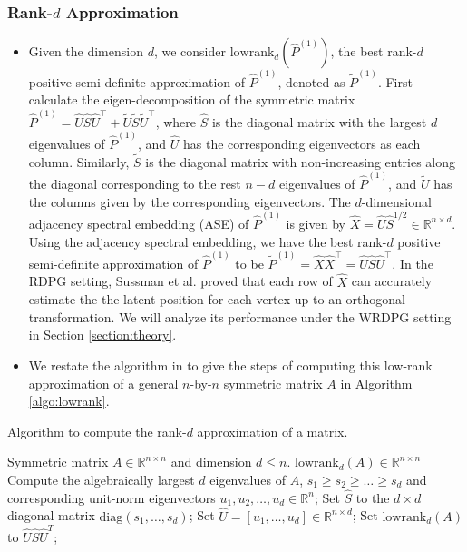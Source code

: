 \documentclass[a4paper]{article}
\renewcommand{\hat}{\widehat}
\renewcommand{\tilde}{\widetilde}
\begin{document}
\subsubsection{Rank-$d$ Approximation}
\begin{itemize}
\item Given the dimension $d$, we consider $\mathrm{lowrank}_d(\hat{P}^{(1)})$, the best rank-$d$ positive semi-definite approximation of $\hat{P}^{(1)}$, denoted as $\widetilde{P}^{(1)}$. First calculate the eigen-decomposition of the symmetric matrix $\hat{P}^{(1)} = \hat{U} \hat{S} \hat{U}^{\top} + \widetilde{U} \widetilde{S} \widetilde{U}^{\top}$, where $\hat{S}$ is the diagonal matrix with the largest $d$ eigenvalues of $\hat{P}^{(1)}$, and $\hat{U}$ has the corresponding eigenvectors as each column. Similarly, $\tilde{S}$ is the diagonal matrix with non-increasing entries along the diagonal corresponding to the rest $n - d$ eigenvalues of $\hat{P}^{(1)}$, and $\tilde{U}$ has the columns given by the corresponding eigenvectors.
The $d$-dimensional adjacency spectral embedding (ASE) of $\hat{P}^{(1)}$ is given by $\hat{X}=\hat{U} \hat{S}^{1/2}\in \mathbb{R}^{n \times d}$.
Using the adjacency spectral embedding, we have the best rank-$d$ positive semi-definite approximation of $\hat{P}^{(1)}$ to be $\widetilde{P}^{(1)} = \hat{X} \hat{X}^{\top}=\hat{U}\hat{S}\hat{U}^{\top}$.
In the RDPG setting, Sussman et al. \cite{sussman2014consistent} proved that each row of $\hat{X}$ can accurately estimate the the latent position for each vertex up to an orthogonal transformation. We will analyze its performance under the WRDPG setting in Section \ref{section:theory}.
\item We restate the algorithm in \cite{tang2016law} to give the steps of computing this low-rank approximation of a general $n$-by-$n$ symmetric matrix $A$ in Algorithm \ref{algo:lowrank}.
\end{itemize}
\begin{algorithm}[H]
\caption{Algorithm to compute the rank-$d$ approximation of a matrix.}
\label{algo:lowrank}
\begin{algorithmic}[1]
\REQUIRE Symmetric matrix $A\in \mathbb{R}^{n \times n}$ and dimension $d\leq n$.
\ENSURE $\mathrm{lowrank}_d(A)\in \mathbb{R}^{n \times n}$
\STATE Compute the algebraically largest $d$ eigenvalues of $A$, $s_1\geq s_2\ge \dotsc \ge s_d$ and corresponding unit-norm eigenvectors $u_1,u_2,\dotsc,u_d\in \mathbb{R}^n$;
\STATE Set $\hat{S}$ to the $d\times d$ diagonal matrix $\mathrm{diag}(s_1,\dotsc,s_d)$;
\STATE Set $\hat{U} = [u_1,\dotsc,u_d]\in \mathbb{R}^{n \times d}$;
\STATE Set $\mathrm{lowrank}_d(A)$ to $\hat{U}\hat{S}\hat{U}^T$;
\end{algorithmic}
\end{algorithm}
\end{document}
